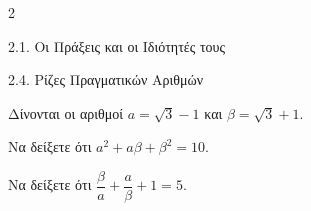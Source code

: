 \begin{ylh}{2}
    \item 2.1. Οι Πράξεις και οι Ιδιότητές τους
    \item 2.4. Ρίζες Πραγματικών Αριθμών
\end{ylh}
Δίνονται οι αριθμοί $a = \sqrt{3} - 1$ και $\beta = \sqrt{3} + 1$.
\begin{alist}
\item Να δείξετε ότι $a^2 + a\beta + \beta^2 = 10$.
\item Να δείξετε ότι $\dfrac{\beta}{a} + \dfrac{a}{\beta} + 1 = 5$.
\end{alist}

